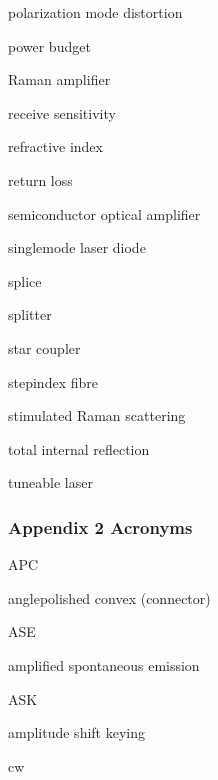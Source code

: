 \documentclass[letterpaper,10pt,english]{sphinxmanual}
\begin{document}
polarization mode distortion

power budget

Raman amplifier

receive sensitivity

refractive index

return loss

semiconductor optical amplifier

single\sphinxhyphen{}mode laser diode

splice

splitter

star coupler

step\sphinxhyphen{}index fibre

stimulated Raman scattering

total internal reflection

tuneable laser


\subsubsection{Appendix 2 Acronyms}
\label{\detokenize{content/session_00/Part_00_06:Appendix-2-Acronyms}}












APC





angle\sphinxhyphen{}polished convex (connector)









ASE





amplified spontaneous emission









ASK





amplitude shift keying









cw
\end{document}
